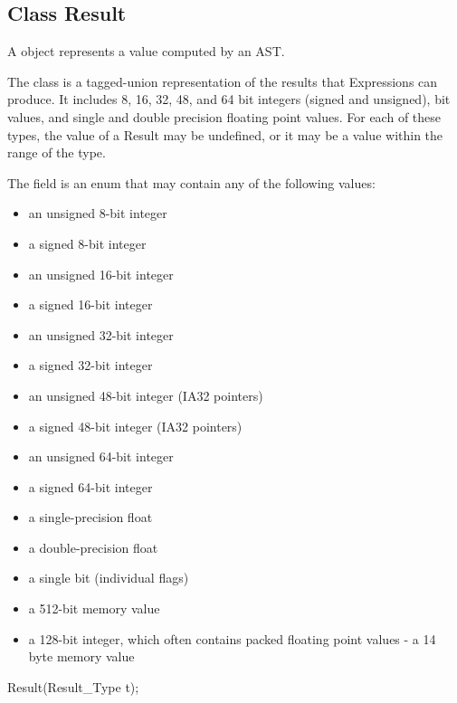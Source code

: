 \subsection{Class Result}
\label{sec:result}


A  object represents a value computed by an  AST.

The  class is a tagged-\/union representation of the results that Expressions can produce. It includes 8, 16, 32, 48, and 64 bit integers (signed and unsigned), bit values, and single and double precision floating point values. For each of these types, the value of a Result may be undefined, or it may be a value within the range of the type.

The  field is an enum that may contain any of the following values:

\begin{itemize}
\item {} an unsigned 8-\/bit integer
\item {} a signed 8-\/bit integer
\item {} an unsigned 16-\/bit integer
\item {} a signed 16-\/bit integer
\item {} an unsigned 32-\/bit integer
\item {} a signed 32-\/bit integer
\item {} an unsigned 48-\/bit integer (IA32 pointers)
\item {} a signed 48-\/bit integer (IA32 pointers)
\item {} an unsigned 64-\/bit integer
\item {} a signed 64-\/bit integer
\item {} a single-\/precision float
\item {} a double-\/precision float
\item {} a single bit (individual flags)
\item {} a 512-\/bit memory value
\item {} a 128-\/bit integer, which often contains packed floating point values -\/  a 14 byte memory value
\end{itemize}

\begin{apient}
Result(Result_Type t);
\end{apient}

